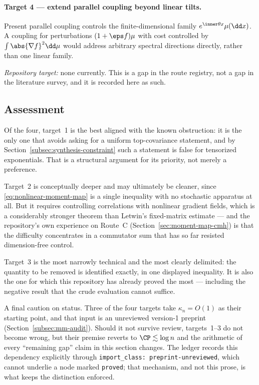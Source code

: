 \documentclass[../../main.tex]{subfiles}
\begin{document}
\paragraph{Target 4 --- extend parallel coupling beyond linear tilts.}
Present parallel coupling controls the finite-dimensional family $e^{\inner\theta x}\mu(\dd x)$. A
coupling for perturbations $(1+\eps f)\mu$ with cost controlled by $\int\abs{\nabla f}^2\dd\mu$
would address arbitrary spectral directions directly, rather than one linear family.

\emph{Repository target:} none currently. This is a gap in the route registry, not a gap in the
literature survey, and it is recorded here as such.

\subsection{Assessment}
\label{subsec:synthesis-assessment}

Of the four, target~1 is the best aligned with the known obstruction: it is the only one that
avoids asking for a uniform top-covariance statement, and by
Section~\ref{subsec:synthesis-constraint} such a statement is false for tensorized exponentials.
That is a structural argument for its priority, not merely a preference.

Target~2 is conceptually deeper and may ultimately be cleaner, since
\eqref{eq:nonlinear-moment-map} is a single inequality with no stochastic apparatus at all. But it
requires controlling correlations with nonlinear gradient fields, which is a considerably stronger
theorem than Letwin's fixed-matrix estimate --- and the repository's own experience on Route~C
(Section~\ref{sec:moment-map-cmh}) is that the difficulty concentrates in a commutator sum that
has so far resisted dimension-free control.

Target~3 is the most narrowly technical and the most clearly delimited: the quantity to be removed
is identified exactly, in one displayed inequality. It is also the one for which this repository
has already proved the most --- including the negative result that the crude evaluation cannot
suffice.

A final caution on status. Three of the four targets take $\kappa_n=O(1)$ as their starting point,
and that input is an unreviewed version-1 preprint (Section~\ref{subsec:mm-audit}). Should it not
survive review, targets~1--3 do not become wrong, but their premise reverts to
$\CP\lesssim\log n$ and the arithmetic of every ``remaining gap'' claim in this section changes.
The ledger records this dependency explicitly through \texttt{import\_class:
preprint-unreviewed}, which cannot underlie a node marked \texttt{proved}; that mechanism, and not
this prose, is what keeps the distinction enforced.
\end{document}
